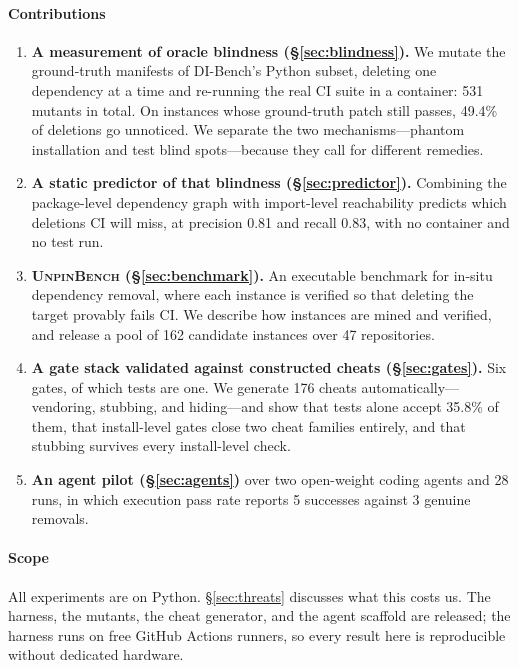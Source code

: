 \documentclass[10pt,conference]{IEEEtran}
\newcommand{\bench}{\textsc{UnpinBench}}
\newcommand{\dibench}{DI-Bench}
\begin{document}
\paragraph*{Contributions}
\begin{enumerate}
  \item \textbf{A measurement of oracle blindness
  (\S\ref{sec:blindness}).} We mutate the ground-truth manifests of
  \dibench's Python subset, deleting one dependency at a time and
  re-running the real CI suite in a container: 531 mutants in total.
  On instances whose ground-truth patch still passes, 49.4\% of
  deletions go unnoticed. We separate the two mechanisms---phantom
  installation and test blind spots---because they call for different
  remedies.

  \item \textbf{A static predictor of that blindness
  (\S\ref{sec:predictor}).} Combining the package-level dependency graph
  with import-level reachability predicts which deletions CI will miss,
  at precision 0.81 and recall 0.83, with no container and no test run.

  \item \textbf{\bench{} (\S\ref{sec:benchmark}).} An executable
  benchmark for in-situ dependency removal, where each instance is
  verified so that deleting the target provably fails CI. We describe
  how instances are mined and verified, and release a pool of 162
  candidate instances over 47 repositories.

  \item \textbf{A gate stack validated against constructed cheats
  (\S\ref{sec:gates}).} Six gates, of which tests are one. We generate
  176 cheats automatically---vendoring, stubbing, and hiding---and show
  that tests alone accept 35.8\% of them, that install-level gates close
  two cheat families entirely, and that stubbing survives every
  install-level check.

  \item \textbf{An agent pilot (\S\ref{sec:agents})} over two
  open-weight coding agents and 28 runs, in which execution pass rate
  reports 5 successes against 3 genuine removals.
\end{enumerate}

\paragraph*{Scope} All experiments are on Python. \S\ref{sec:threats}
discusses what this costs us. The harness, the mutants, the cheat
generator, and the agent scaffold are released; the harness runs on free
GitHub Actions runners, so every result here is reproducible without
dedicated hardware.
\end{document}
